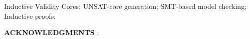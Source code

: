 \documentclass[10pt, conference]{IEEEtran}
\begin{document}
\begin{IEEEkeywords}
Inductive Validity Cores; UNSAT-core generation; SMT-based model checking; Inductive proofs;
\end{IEEEkeywords}

\IEEEpeerreviewmaketitle


%










%


%
%
%

%



\vspace{0.08in}
\textbf{ACKNOWLEDGMENTS} .
\vspace{0.08in}





%
%


\end{document}
